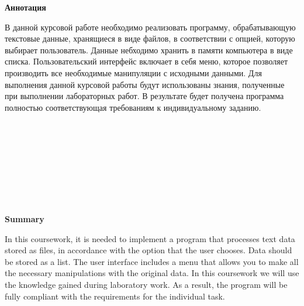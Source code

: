 \begin{center}
	\Large{
		\textbf{Аннотация}
	}
\end{center}


В данной курсовой работе необходимо реализовать программу, обрабатывающую текстовые данные, хранящиеся в виде файлов, в соответствии с опцией, которую выбирает пользователь. Данные небходимо хранить в памяти компьютера в виде списка. Пользовательский интерфейс включает в себя меню, которое позволяет производить все необходимые манипуляции с исходными данными. Для выполнения данной курсовой работы будут использованы знания, полученные при выполнении лабораторных работ. В результате будет получена программа полностью соответствующая требованиям к индивидуальному заданию.
\\
\\
\\
\\
\\
\\
\\
\\
\\
\begin{center}
	\Large{
		\textbf{Summary}
	}
\end{center}

In this coursework, it is needed to implement a program that processes text data stored as files, in accordance with the option that the user chooses. Data should be stored as a list. The user interface includes a menu that allows you to make all the necessary manipulations with the original data. In this coursework we will use the knowledge gained during laboratory work. As a result, the program will be fully compliant with the requirements for the individual task.